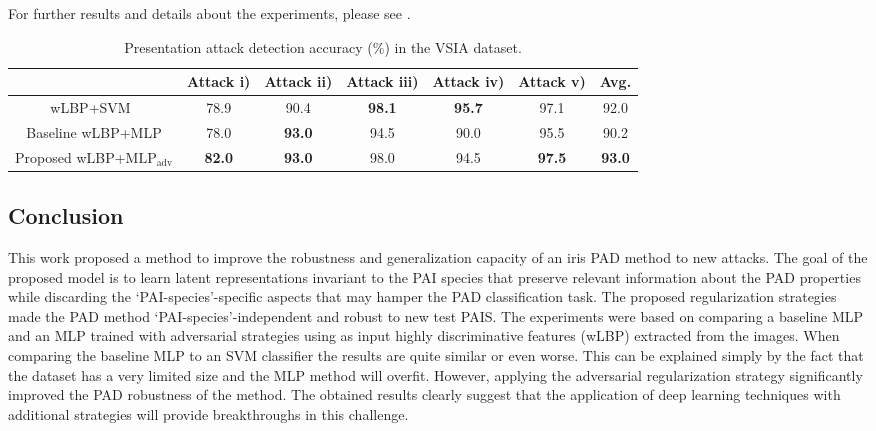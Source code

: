 For further results and details about the experiments, please see \citet{AdvInvAttack}.

\begin{table}[t]
    \centering
    \begin{small}
        \begin{tabular}{c|c c c c c:c}
            & Attack i)
            & Attack ii)
            & Attack iii)
            & Attack iv)
            & Attack v)
            & Avg. \\ \hline

            wLBP+SVM~\cite{sequeira2016realistic}
            &78.9     &90.4     &\bf 98.1 &\bf 95.7 & 97.1     & 92.0 \\
            Baseline wLBP+MLP
            &78.0     &\bf 93.0  &94.5    &90.0   &95.5     &90.2 \\
            Proposed wLBP+$\text{MLP}_\text{adv}$
            &\bf82.0  &\bf 93.0  &98.0   &94.5   &\bf 97.5  &\bf 93.0
        \end{tabular}
    \end{small}
    \caption{Presentation attack detection accuracy (\%) in the VSIA dataset.}
    \label{tab:pad_accuracy}
\end{table}

\subsection{Conclusion}
\label{sec:adv_iris_attack_conclusion}
This work proposed a method to improve the robustness and generalization capacity of an iris PAD method to new attacks. The goal of the proposed model is to learn latent representations invariant to the PAI species that preserve relevant information about the PAD properties while discarding the `PAI-species'-specific aspects that may hamper the PAD classification task. The proposed regularization strategies made the PAD method `PAI-species'-independent and robust to new test PAIS.
The experiments were based on comparing a baseline MLP and an MLP trained with adversarial strategies using as input highly discriminative features (wLBP) extracted from the images. When comparing the baseline MLP to an SVM classifier the results are quite similar or even worse. This can be explained simply by the fact that the dataset has a very limited size and the MLP method will overfit.
However, applying the adversarial regularization strategy significantly improved the PAD robustness of the method. The obtained results clearly suggest that the application of deep learning techniques with additional strategies will provide breakthroughs in this challenge.

